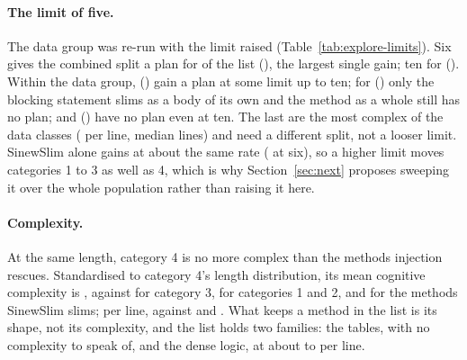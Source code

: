 \documentclass[11pt,a4paper]{article}
\begin{document}
\paragraph{The limit of five.} The data group was re-run with the limit
raised (Table~\ref{tab:explore-limits}). Six gives the combined split a plan
for \exLimitSixN{} of the list (\exLimitSix{}), the largest single gain; ten
for \exLimitTenN{} (\exLimitTen{}). Within the data group,
\exDataPlanShare{} (\exDataPlan{}) gain a plan at some limit up to ten; for
\exDataBodyShare{} (\exDataBody{}) only the blocking statement slims as a
body of its own and the method as a whole still has no plan; and
\exDataNoneShare{} (\exDataNone{}) have no plan even at ten. The last are
the most complex of the data classes (\exDataNoneCogPerLine{} per line,
median \exDataNoneLength{} lines) and need a different split, not a looser
limit. SinewSlim alone gains at about the same rate (\exLimitSixConventionalN{}
at six), so a higher limit moves categories 1 to 3 as well as 4, which is
why Section~\ref{sec:next} proposes sweeping it over the whole population
rather than raising it here.

\begin{table}[t]
\centering\small
\caption{Exploratory: of the category 4 methods, how many have a plan when the limit of five is raised, under the combined split, under SinewSlim alone (its parameters a piece) and under the injection split alone (its carried values a function).}
\label{tab:explore-limits}

\end{table}

\paragraph{Complexity.} At the same length, category 4 is no more complex
than the methods injection rescues. Standardised to category 4's length
distribution, its mean cognitive complexity is \exCogCatFour{}, against
\exCogRescued{} for category 3, \exCogConventional{} for categories 1 and 2,
and \exCogSlimmable{} for the methods SinewSlim slims; per line,
\exCogPerLineCatFour{} against \exCogPerLineRescued{} and
\exCogPerLineConventional{}. What keeps a method in the list is its shape,
not its complexity, and the list holds two families: the tables, with no
complexity to speak of, and the dense logic, at about
\exDataNoneCogPerLine{} to \exCogPerLineLoopHi{} per line.
\end{document}
